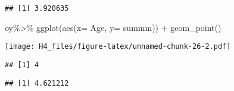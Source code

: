 \documentclass[
]{article}
\newenvironment{Shaded}{\begin{snugshade}}{\end{snugshade}}
\newcommand{\AttributeTok}[1]{\textcolor[rgb]{0.77,0.63,0.00}{#1}}
\newcommand{\FunctionTok}[1]{\textcolor[rgb]{0.00,0.00,0.00}{#1}}
\newcommand{\NormalTok}[1]{#1}
\newcommand{\SpecialCharTok}[1]{\textcolor[rgb]{0.00,0.00,0.00}{#1}}
\begin{document}
\begin{Shaded}
\end{Shaded}

\begin{verbatim}
## [1] 3.920635
\end{verbatim}

\begin{Shaded}
\begin{Highlighting}[]
\NormalTok{oy}\SpecialCharTok{\%\textgreater{}\%} \FunctionTok{ggplot}\NormalTok{(}\FunctionTok{aes}\NormalTok{(}\AttributeTok{x=}\NormalTok{ Age, }\AttributeTok{y=}\NormalTok{ summm)) }\SpecialCharTok{+} \FunctionTok{geom\_point}\NormalTok{()}
\end{Highlighting}
\end{Shaded}

\texttt{[image: H4\_files/figure-latex/unnamed-chunk-26-2.pdf]}

\begin{Shaded}
\end{Shaded}

\begin{verbatim}
## [1] 4
\end{verbatim}

\begin{Shaded}
\end{Shaded}

\begin{verbatim}
## [1] 4.621212
\end{verbatim}
\end{document}
